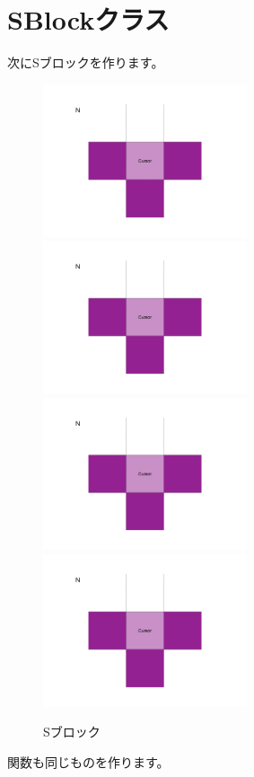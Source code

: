 \section{SBlockクラス}
次にSブロックを作ります。
\begin{figure}[h]
  \includegraphics[width=60mm, page=13]{images/Blocks.pdf}
  \includegraphics[width=60mm, page=14]{images/Blocks.pdf}
  \includegraphics[width=60mm, page=15]{images/Blocks.pdf}
  \includegraphics[width=60mm, page=16]{images/Blocks.pdf}
  \caption{Sブロック}

\end{figure}
関数も同じものを作ります。

\newpage
